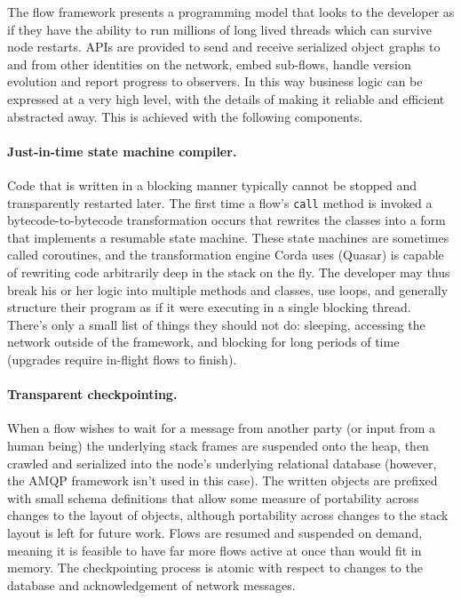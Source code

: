 \documentclass{article}
\begin{document}
The flow framework presents a programming model that looks to the developer as if they have the ability to run
millions of long lived threads which can survive node restarts. APIs are provided to send and receive serialized
object graphs to and from other identities on the network, embed sub-flows, handle version evolution and report
progress to observers. In this way business logic can be expressed at a very high level, with the details of making
it reliable and efficient abstracted away. This is achieved with the following components.

\paragraph{Just-in-time state machine compiler.}Code that is written in a blocking manner typically cannot be
stopped and transparently restarted later. The first time a flow's \texttt{call} method is invoked a
bytecode-to-bytecode transformation occurs that rewrites the classes into a form that implements a resumable state
machine. These state machines are sometimes called coroutines, and the transformation engine Corda uses (Quasar) is
capable of rewriting code arbitrarily deep in the stack on the fly. The developer may thus break his or her logic
into multiple methods and classes, use loops, and generally structure their program as if it were executing in a
single blocking thread. There's only a small list of things they should not do: sleeping, accessing the
network outside of the framework, and blocking for long periods of time (upgrades require in-flight flows to finish).

\paragraph{Transparent checkpointing.}When a flow wishes to wait for a message from another party (or input from a
human being) the underlying stack frames are suspended onto the heap, then crawled and serialized into the node's
underlying relational database (however, the AMQP framework isn't used in this case). The written objects are
prefixed with small schema definitions that allow some measure of portability across changes to the layout of
objects, although portability across changes to the stack layout is left for future work. Flows are resumed and
suspended on demand, meaning it is feasible to have far more flows active at once than would fit in memory. The
checkpointing process is atomic with respect to changes to the database and acknowledgement of network messages.
\end{document}
